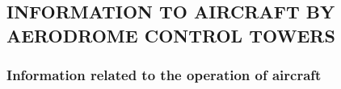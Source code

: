 \documentclass[../main.tex]{subfiles}
\begin{document}

    \subsection[Information to aircraft by aerodrome control towers]{INFORMATION TO AIRCRAFT BY AERODROME CONTROL TOWERS}

    \subsubsection{Information related to the operation of aircraft}

    \begin{enumempty}[labelindent=\parindent]
        \item {}
    \end{enumempty}
\end{document}
